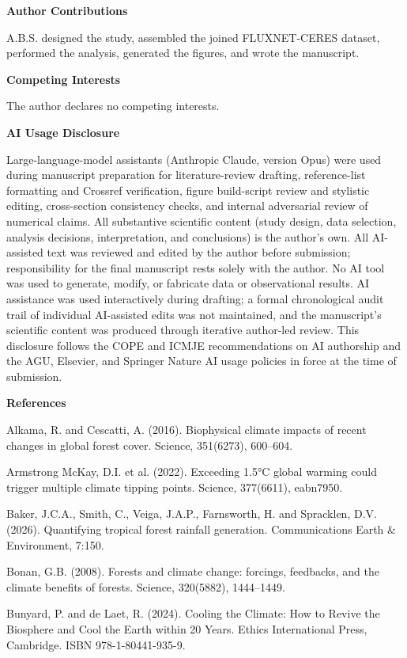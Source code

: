 \textbf{Author Contributions}

A.B.S. designed the study, assembled the joined FLUXNET-CERES dataset,
performed the analysis, generated the figures, and wrote the
manuscript.

\textbf{Competing Interests}

The author declares no competing interests.

\textbf{AI Usage Disclosure}

Large-language-model assistants (Anthropic Claude, version Opus) were
used during manuscript preparation for literature-review drafting,
reference-list formatting and Crossref verification, figure
build-script review and stylistic editing, cross-section consistency
checks, and internal adversarial review of numerical claims. All
substantive scientific content (study design, data selection, analysis
decisions, interpretation, and conclusions) is the author's own. All
AI-assisted text was reviewed and edited by the author before
submission; responsibility for the final manuscript rests solely with
the author. No AI tool was used to generate, modify, or fabricate data
or observational results. AI assistance was used interactively during
drafting; a formal chronological audit trail of individual AI-assisted
edits was not maintained, and the manuscript's scientific content was
produced through iterative author-led review. This disclosure follows
the COPE and ICMJE recommendations on AI authorship and the AGU,
Elsevier, and Springer Nature AI usage policies in force at the time
of submission.

\textbf{References}

Alkama, R. and Cescatti, A. (2016). Biophysical climate impacts of
recent changes in global forest cover. Science, 351(6273), 600--604.

Armstrong McKay, D.I. et al. (2022). Exceeding 1.5°C global warming
could trigger multiple climate tipping points. Science, 377(6611),
eabn7950.

Baker, J.C.A., Smith, C., Veiga, J.A.P., Farnsworth, H. and Spracklen,
D.V. (2026). Quantifying tropical forest rainfall generation.
Communications Earth \& Environment, 7:150.

Bonan, G.B. (2008). Forests and climate change: forcings, feedbacks, and
the climate benefits of forests. Science, 320(5882), 1444--1449.

Bunyard, P. and de Laet, R. (2024). Cooling the Climate: How to Revive
the Biosphere and Cool the Earth within 20 Years. Ethics International
Press, Cambridge. ISBN 978-1-80441-935-9.

